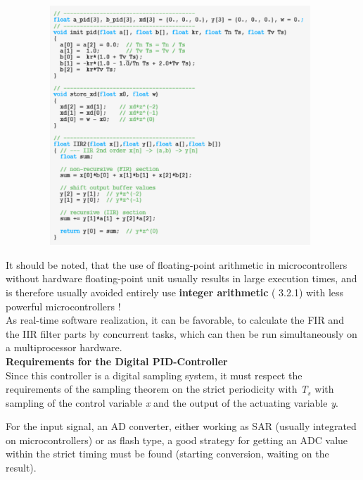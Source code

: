 	\begin{figure}[h]
    \centering
    \includegraphics[width=11cm, height=9cm]{Images/image153.png}
    \label{fig:Fig }
    \end{figure}

It should be noted, that the use of floating-point arithmetic in microcontrollers without hardware floating-point unit usually results in large execution times, and is therefore usually avoided entirely  use \textbf{integer arithmetic} ( 3.2.1) with less powerful microcontrollers !\\

As real-time software realization, it can be favorable, to calculate the FIR and the IIR filter parts by concurrent tasks, which can then be run simultaneously on a multiprocessor hardware.\\

{\rot\bf Requirements for the Digital PID-Controller}\\

Since this controller is a digital sampling system, it must respect the requirements of the sampling theorem on the strict periodicity with \textit{T${}_{s}$} with sampling of the control variable \textit{x} and the output of the actuating variable \textit{y}. 

For the input signal, an AD converter, either working as SAR (usually integrated on microcontrollers) or as flash type, a good strategy for getting an ADC value within the strict timing must be found (starting conversion, waiting on the result).\\

